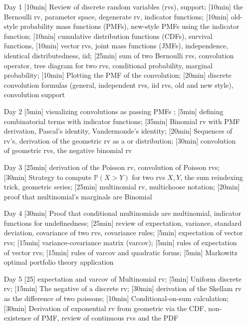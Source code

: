 \begin{enumerate}
\item[Day 1] [10min] Review of discrete random variables (rvs), support; [10min] the Bernoulli rv, parameter space, degenerate rv, indicator functions; [10min] old-style probability mass functions (PMFs), new-style PMFs using the indicator function; [10min] cumulative distribution functions (CDFs), survival functions, [10min] vector rvs, joint mass functions (JMFs), independence, identical distributedness, iid; [25min] sum of two Bernoulli rvs, convolution operator, tree diagram for two rvs, conditional probability, marginal probability; [10min] Plotting the PMF of the convolution; [20min] discrete convolution formulas (general, independent rvs, iid rvs, old and new style), convolution support

\item[Day 2] [5min] visualizing convolutions as passing PMFs ; [5min] defining combinatorial terms with indicator functions; [35min] Binomial rv with PMF derivation, Pascal's identity, Vandermonde's identity; [20min] Sequences of rv's, derivation of the geometric rv as a  or  distribution; [30min] convolution of geometric rvs, the negative binomial rv

\item[Day 3] [25min] derivation of the Poisson rv, convolution of Poisson rvs; [30min] Strategy to compute $\mathbb{P}(X > Y)$ for two rvs $X, Y$, the sum reindexing trick, geometric series; [25min] multinomial rv, multichoose notation; [20min] proof that multinomial's marginals are Binomial 

\item[Day 4] [30min] Proof that conditional multinomials are multinomial, indicator functions for undefinedness; [25min] review of expectation, variance, standard deviation, covariance of two rvs, covariance rules; [5min] expectation of vector rvs; [15min] variance-covariance matrix (varcov); [5min] rules of expectation of vector rvs; [15min] rules of varcov and quadratic forms; [5min] Markowitz optimal portfolio theory application

\item[Day 5] [25] expectation and varcov of Multinomial rv; [5min] Uniform discrete rv; [15min] The negative of a discrete rv; [30min] derivation of the Skellam rv as the difference of two poissons; [10min] Conditional-on-sum calculation; [30min] Derivation of exponential rv from geometric via the CDF, non-existence of PMF, review of continuous rvs and the PDF


\end{enumerate}
